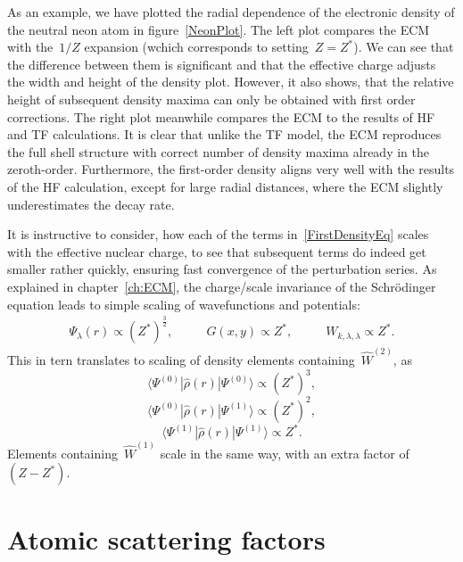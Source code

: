 As an example, we have plotted the radial dependence of the electronic density of the neutral neon atom in figure~\ref{NeonPlot}. The left plot compares the ECM with the~$1/Z$ expansion (wchich corresponds to setting~$Z=Z^*$). We can see that the difference between them is significant and that the effective charge adjusts the width and height of the density plot. However, it also shows, that the relative height of subsequent density maxima can only be obtained with first order corrections. The right plot meanwhile compares the ECM to the results of HF and TF calculations. It is clear that unlike the TF model, the ECM reproduces the full shell structure with correct number of density maxima already in the zeroth-order. Furthermore, the first-order density aligns very well with the results of the HF calculation, except for large radial distances, where the ECM slightly underestimates the decay rate.

It is instructive to consider, how each of the terms in~\eqref{FirstDensityEq} scales with the effective nuclear charge, to see that subsequent terms do indeed get smaller rather quickly, ensuring fast convergence of the perturbation series. As explained in chapter~\ref{ch:ECM}, the charge/scale invariance of the Schr\"{o}dinger equation leads to simple scaling of wavefunctions and potentials:
\begin{align}
    \Psi_{\lambda}(r) \propto (Z^*)^\frac{3}{2},~~~~~~~~~~~~G(x,y) \propto Z^*,~~~~~~~~~~~~W_{k,\lambda,\lambda} \propto Z^*.
\end{align}
This in tern translates to scaling of density elements containing~$\widehat{W}^{(2)}$, as
\begin{equation}
\langle\Psi^{(0)}|\widehat{\rho}(r)|\Psi^{(0)}\rangle \propto (Z^*)^3 ,
\end{equation} 
\begin{equation}
\langle\Psi^{(0)}|\widehat{\rho}(r)|\Psi^{(1)}\rangle \propto (Z^*)^2 ,
\end{equation} 
\begin{equation}
 \langle\Psi^{(1)}|\widehat{\rho}(r)|\Psi^{(1)}\rangle \propto Z^* .
\end{equation} 
Elements containing~$\widehat{W}^{(1)}$ scale in the same way, with an extra factor of~$(Z-Z^*)$.

\section{Atomic scattering factors}
\label{sec:atom-scatt-fact}

